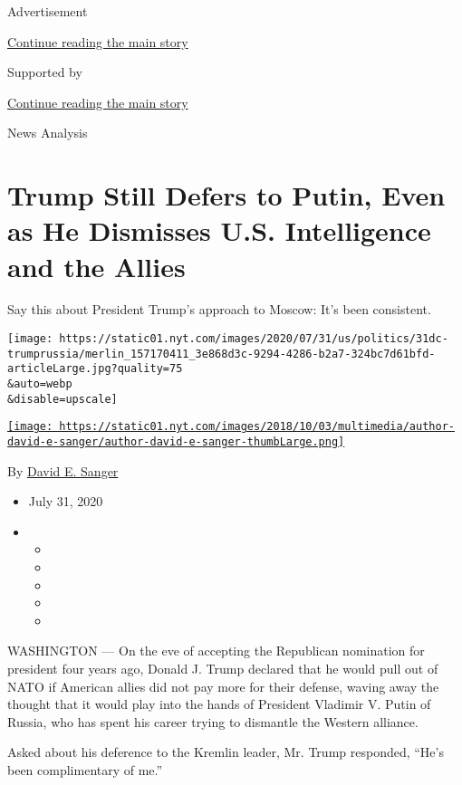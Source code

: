 Advertisement

\protect\hyperlink{after-top}{Continue reading the main story}

Supported by

\protect\hyperlink{after-sponsor}{Continue reading the main story}

News Analysis

\hypertarget{trump-still-defers-to-putin-even-as-he-dismisses-us-intelligence-and-the-allies}{%
\section{Trump Still Defers to Putin, Even as He Dismisses U.S.
Intelligence and the
Allies}\label{trump-still-defers-to-putin-even-as-he-dismisses-us-intelligence-and-the-allies}}

Say this about President Trump's approach to Moscow: It's been
consistent.

\texttt{[image: https://static01.nyt.com/images/2020/07/31/us/politics/31dc-trumprussia/merlin\_157170411\_3e868d3c-9294-4286-b2a7-324bc7d61bfd-articleLarge.jpg?quality=75\\\&auto=webp\\\&disable=upscale]}

\href{https://www.nytimes.com/by/david-e-sanger}{\texttt{[image: https://static01.nyt.com/images/2018/10/03/multimedia/author-david-e-sanger/author-david-e-sanger-thumbLarge.png]}}

By \href{https://www.nytimes.com/by/david-e-sanger}{David E. Sanger}

\begin{itemize}
\item
  July 31, 2020
\item
  \begin{itemize}
  \item
  \item
  \item
  \item
  \item
  \end{itemize}
\end{itemize}

WASHINGTON --- On the eve of accepting the Republican nomination for
president four years ago, Donald J. Trump declared that he would pull
out of NATO if American allies did not pay more for their defense,
waving away the thought that it would play into the hands of President
Vladimir V. Putin of Russia, who has spent his career trying to
dismantle the Western alliance.

Asked about his deference to the Kremlin leader, Mr. Trump responded,
``He's been complimentary of me.''

